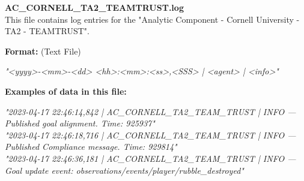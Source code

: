\begin{description}
\begin{addmargin}[0em]{0em}
    \label{AC_CORNELL_TA2_TEAMTRUST.log}
    \begin{addmargin}[1em]{0em} %
        \textbf{AC\_CORNELL\_TA2\_TEAMTRUST.log}\\
        This file contains log entries for the "Analytic Component - Cornell University - TA2 - TEAMTRUST".
        \begin{addmargin}[1em]{0em}
            \textbf{Format:} (Text File)
            \begin{addmargin}[1em]{0em}
                \textit{"<yyyy>-<mm>-<dd> <hh>:<mm>:<ss>,<SSS> | <agent> | <info>"}
            \end{addmargin}
        \end{addmargin}
        \begin{addmargin}[1em]{0em}
            \textbf{Examples of data in this file:}
            \begin{addmargin}[1em]{0em}\textit{"2023-04-17 22:46:14,842 | AC\_CORNELL\_TA2\_TEAM\_TRUST | INFO — Published goal alignment. Time: 925937"\\
                "2023-04-17 22:46:18,716 | AC\_CORNELL\_TA2\_TEAM\_TRUST | INFO — Published Compliance message. Time: 929814"\\
                "2023-04-17 22:46:36,181 | AC\_CORNELL\_TA2\_TEAM\_TRUST |  INFO — Goal update event: observations/events/player/rubble\_destroyed"}
            \end{addmargin}
        \end{addmargin}
    \end{addmargin} %
    \textbf{\\}


\end{addmargin}
\end{description}
